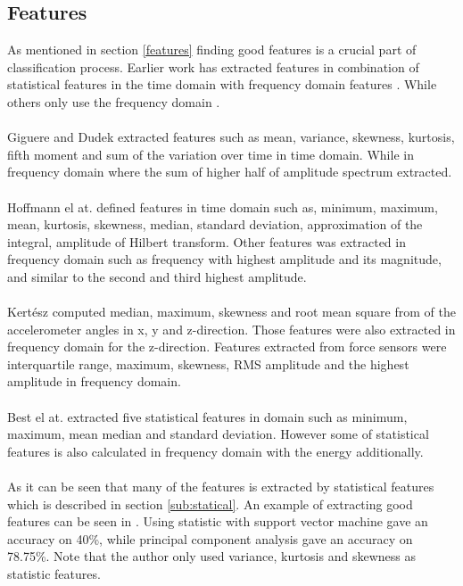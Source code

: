 \documentclass[USenglish]{ifimaster}  %
\begin{document}
	\subsection{Features} \label{sub:relatedfeatures}
	As mentioned in section \ref{features} finding good features is a crucial part of classification process. Earlier work has extracted features in combination of statistical features in the time domain with frequency domain features \cite{5152662} \cite{Giguere2009} \cite{5509309}. While others only use the frequency domain \cite{4543710} \cite{5979766}.
	\\
	\\
	Giguere and Dudek \cite{5152662} extracted features such as mean, variance, skewness, kurtosis, fifth moment and sum of the variation over time in time domain. While in frequency domain where the sum of higher half of amplitude spectrum extracted.
	\\
	\\
	Hoffmann el at. \cite{Hoffmann20141790} defined features in time domain such as, minimum, maximum, mean, kurtosis, skewness, median, standard deviation, approximation of the integral, amplitude of Hilbert transform. Other features was extracted in frequency domain such as frequency with highest amplitude and its magnitude, and similar to the second and third highest amplitude. 
	\\
	\\
	Kertész \cite{7387710} computed median, maximum, skewness and root mean square from of the accelerometer angles in x, y and z-direction. Those features were also extracted in frequency domain for the z-direction. Features extracted from force sensors were interquartile range, maximum, skewness, RMS amplitude and the highest amplitude in frequency domain.
	\\
	\\
	Best el at.\cite{26b23e912c654fe4b7478fd910130195} extracted five statistical features in domain such as minimum, maximum, mean median and standard deviation. However some of statistical features is also calculated in frequency domain with the energy additionally.
	\\
	\\
	As it can be seen that many of the features is extracted by statistical features which is described in section \ref{sub:statical}. An example of extracting good features can be seen in \cite{5602459}. Using statistic with support vector machine gave an accuracy on 40\%, while principal component analysis gave an accuracy on 78.75\%. Note that the author only used variance, kurtosis and skewness as statistic features. 
	
\end{document}

